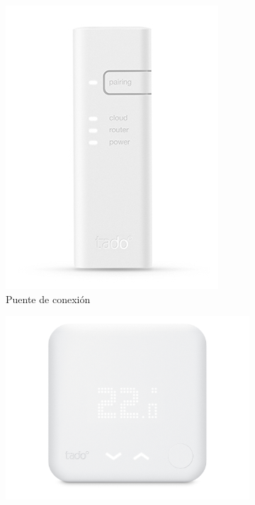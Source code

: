 \documentclass[spanish,12pt, a4paper, twoside]{paper}
\begin{document}
\begin{figure}[h]
\begin{subfigure}{0.5\textwidth}
\includegraphics[width=\textwidth]{recursos/bridge.jpg}
\caption{Puente de conexión}
\label{fig:bridge tado}
\end{subfigure}
\begin{subfigure}{0.5\textwidth}
\includegraphics[width=\textwidth]{recursos/termostato.jpeg}

\end{subfigure}
\end{figure}
\end{document}
